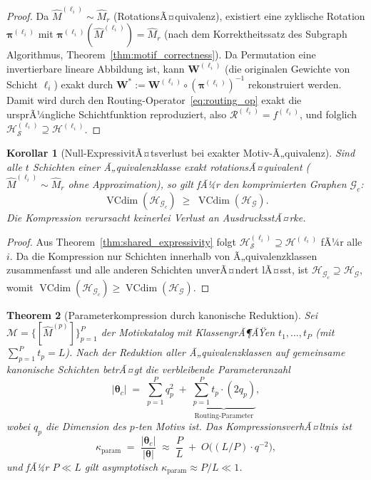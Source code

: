 ﻿\documentclass[12pt, a4paper, openany]{report}
\newtheorem{theorem}{Theorem}[chapter]
\newtheorem{corollary}[theorem]{Korollar}
\newcommand{\calG}{\mathcal{G}}
\newcommand{\calH}{\mathcal{H}}
\newcommand{\calR}{\mathcal{R}}
\newcommand{\calM}{\mathcal{M}}
\newcommand{\calS}{\mathcal{S}}
\DeclareMathOperator{\VC}{VCdim}
\begin{document}
\begin{proof}
Da $\hat{M}^{(\ell_i)} \sim \hat{M}_r$ (RotationsÃ¤quivalenz), existiert eine
zyklische Rotation $\bm{\pi}^{(\ell_i)}$ mit
$\bm{\pi}^{(\ell_i)}(\hat{M}^{(\ell_i)}) = \hat{M}_r$ (nach dem
Korrektheitssatz des Subgraph Algorithmus, Theorem~\ref{thm:motif_correctness}).
Da Permutation eine invertierbare lineare Abbildung ist, kann
$\bm{W}^{(\ell_i)}$ (die originalen Gewichte von Schicht $\ell_i$) exakt durch
$\bm{W}^* := \bm{W}^{(\ell_i)} \circ (\bm{\pi}^{(\ell_i)})^{-1}$ rekonstruiert
werden.  Damit wird durch den Routing-Operator~\eqref{eq:routing_op} exakt
die ursprÃ¼ngliche Schichtfunktion reproduziert, also
$\calR^{(\ell_i)} = f^{(\ell_i)}$, und folglich
$\calH_{\calS}^{(\ell_i)} \supseteq \calH^{(\ell_i)}$.
\end{proof}

\begin{corollary}[Null-ExpressivitÃ¤tsverlust bei exakter Motiv-Ã„quivalenz]
\label{cor:no_loss}
Sind alle $t$ Schichten einer Ã„quivalenzklasse exakt rotationsÃ¤quivalent
($\hat{M}^{(\ell_i)} \sim \hat{M}_r$ ohne Approximation), so gilt fÃ¼r den
komprimierten Graphen $\calG_c$:
\[
  \VC(\calH_{\calG_c}) \;\geq\; \VC(\calH_{\calG}).
\]
Die Kompression verursacht keinerlei Verlust an AusdrucksstÃ¤rke.
\end{corollary}

\begin{proof}
Aus Theorem~\ref{thm:shared_expressivity} folgt
$\calH_{\calS}^{(\ell_i)} \supseteq \calH^{(\ell_i)}$ fÃ¼r alle $i$.
Da die Kompression nur Schichten innerhalb von Ã„quivalenzklassen
zusammenfasst und alle anderen Schichten unverÃ¤ndert lÃ¤sst, ist
$\calH_{\calG_c} \supseteq \calH_{\calG}$, womit
$\VC(\calH_{\calG_c}) \geq \VC(\calH_{\calG})$.
\end{proof}

\begin{theorem}[Parameterkompression durch kanonische Reduktion]
\label{thm:param_compression}
Sei $\calM = \{[\hat{M}^{(p)}]\}_{p=1}^P$ der Motivkatalog mit
KlassengrÃ¶ÃŸen $t_1, \ldots, t_P$ (mit $\sum_{p=1}^P t_p = L$).
Nach der Reduktion aller Ã„quivalenzklassen auf gemeinsame kanonische
Schichten betrÃ¤gt die verbleibende Parameteranzahl
\begin{equation}
  \label{eq:param_count}
  |\bm{\theta}_c|
  \;=\;
  \sum_{p=1}^{P} q_p^2
  \;+\;
  \underbrace{\sum_{p=1}^{P} t_p \cdot (2q_p)}_{\text{Routing-Parameter}},
\end{equation}
wobei $q_p$ die Dimension des $p$-ten Motivs ist.  Das
\emph{Kompressionsver\-hÃ¤ltnis} ist
\begin{equation}
  \label{eq:compression_ratio}
  \kappa_{\mathrm{param}}
  \;=\;
  \frac{|\bm{\theta}_c|}{|\bm{\theta}|}
  \;\approx\;
  \frac{P}{L} \;+\; O\!\bigl((L/P) \cdot q^{-2}\bigr),
\end{equation}
und fÃ¼r $P \ll L$ gilt asymptotisch $\kappa_{\mathrm{param}} \approx P/L \ll 1$.
\end{theorem}
\end{document}
